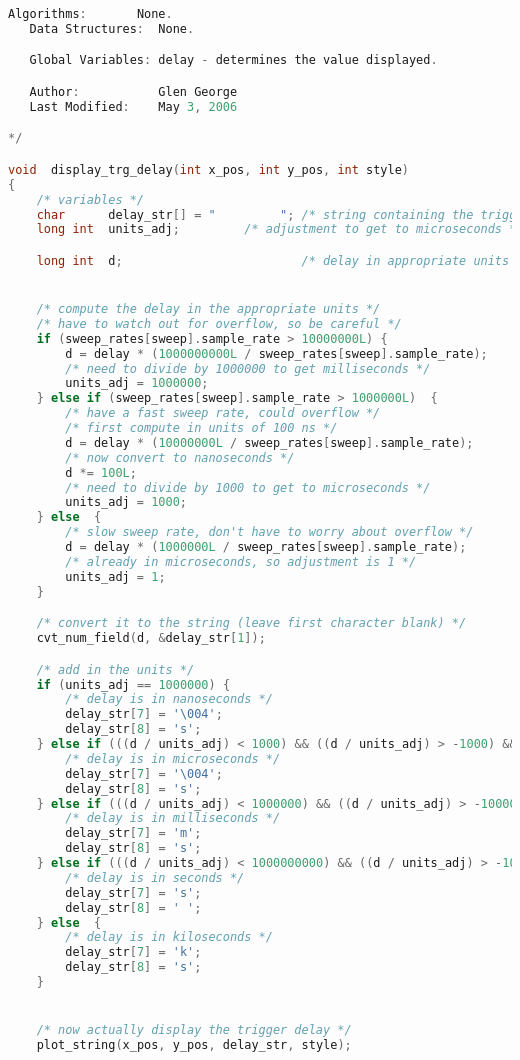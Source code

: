 \begin{lstlisting}[language=C]
   Algorithms:       None.
   Data Structures:  None.

   Global Variables: delay - determines the value displayed.

   Author:           Glen George
   Last Modified:    May 3, 2006

*/

void  display_trg_delay(int x_pos, int y_pos, int style)
{
    /* variables */
    char      delay_str[] = "         "; /* string containing the trigger delay */
    long int  units_adj;		 /* adjustment to get to microseconds */

    long int  d;                         /* delay in appropriate units */


    /* compute the delay in the appropriate units */
    /* have to watch out for overflow, so be careful */
    if (sweep_rates[sweep].sample_rate > 10000000L) {
    	d = delay * (1000000000L / sweep_rates[sweep].sample_rate);
    	/* need to divide by 1000000 to get milliseconds */
    	units_adj = 1000000;
    } else if (sweep_rates[sweep].sample_rate > 1000000L)  {
        /* have a fast sweep rate, could overflow */
        /* first compute in units of 100 ns */
        d = delay * (10000000L / sweep_rates[sweep].sample_rate);
		/* now convert to nanoseconds */
		d *= 100L;
		/* need to divide by 1000 to get to microseconds */
		units_adj = 1000;
    } else  {
        /* slow sweep rate, don't have to worry about overflow */
        d = delay * (1000000L / sweep_rates[sweep].sample_rate);
		/* already in microseconds, so adjustment is 1 */
		units_adj = 1;
    }

    /* convert it to the string (leave first character blank) */
    cvt_num_field(d, &delay_str[1]);

    /* add in the units */
    if (units_adj == 1000000) {
        /* delay is in nanoseconds */
		delay_str[7] = '\004';
		delay_str[8] = 's';
    } else if (((d / units_adj) < 1000) && ((d / units_adj) > -1000) && (units_adj == 1000)) {
        /* delay is in microseconds */
		delay_str[7] = '\004';
		delay_str[8] = 's';
    } else if (((d / units_adj) < 1000000) && ((d / units_adj) > -1000000)) {
        /* delay is in milliseconds */
		delay_str[7] = 'm';
		delay_str[8] = 's';
    } else if (((d / units_adj) < 1000000000) && ((d / units_adj) > -1000000000))  {
        /* delay is in seconds */
		delay_str[7] = 's';
		delay_str[8] = ' ';
    } else  {
        /* delay is in kiloseconds */
		delay_str[7] = 'k';
		delay_str[8] = 's';
    }


    /* now actually display the trigger delay */
    plot_string(x_pos, y_pos, delay_str, style);



\end{lstlisting}

